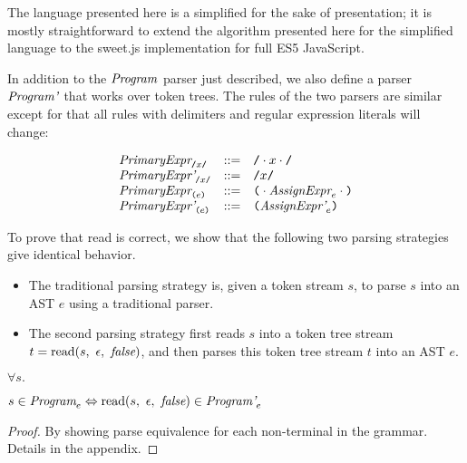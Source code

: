 \documentclass[preprint,10pt]{sigplanconf}
\begin{document}
The language presented here is a simplified for the sake of
presentation; it is mostly straightforward to extend the algorithm
presented here for the simplified language to 
the sweet.js implementation for full ES5 JavaScript.

In addition to the \( \textit{Program}_{} \) parser just described, we
also define a parser \( \textit{Program'}_{} \) that works over token
trees. The rules of the two parsers are similar except for that
all rules with delimiters and regular expression literals will change:

\[
\begin{array}{lcl}
  \textit{PrimaryExpr}_{\texttt{/}x\texttt{/}} &::=& \texttt{/}\cdot x \cdot \texttt{/}
  \\
  \textit{PrimaryExpr'}_{\texttt{/}x\texttt{/}} &::=& \texttt{/}x\texttt{/}
  \\
  \textit{PrimaryExpr}_{\texttt{(}e\texttt{)}} &::=& 
  \texttt{(} \cdot \textit{AssignExpr}_{e} \cdot \texttt{)}
  \\
  \textit{PrimaryExpr'}_{\texttt{(}e\texttt{)}} &::=& 
  \texttt{(}\textit{AssignExpr'}_{e}\texttt{)}
  \\
\end{array}
\]

To prove that read is correct, we show that the following two parsing
strategies give identical behavior.
\begin{itemize}
\item The traditional parsing strategy is, given a token stream \( s
  \), to parse \( s \) into an AST \( e \) using a traditional parser.

\item The second parsing strategy first reads \( s \) into a token
  tree stream \( t = \textrm{read}(s,~\epsilon,~\textit{false}) \), and then parses
  this token tree stream \( t \) into an AST \( e \).
\end{itemize}

\begin{theorem}\mbox{}

  \( \forall s. \)

  \( s \in \textit{Program}_{e} \Leftrightarrow 
  \textrm{read}(s,~\epsilon,~\textit{false}) \in \textit{Program'}_{e} \)

\end{theorem}
\begin{proof}\mbox{}
  By showing parse equivalence for each non-terminal in the grammar.
  Details in the appendix.
\end{proof}
\end{document}
